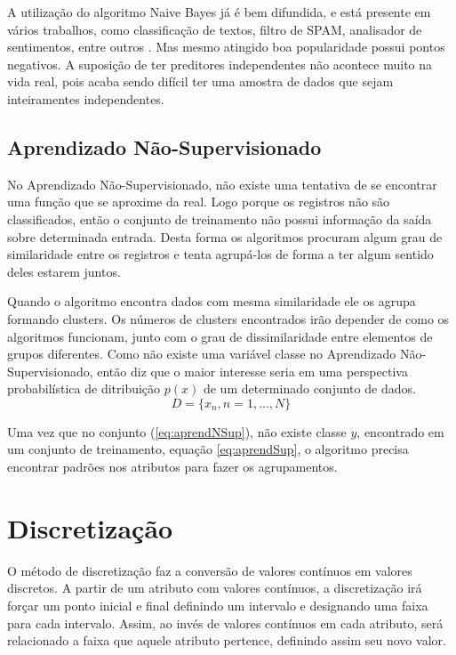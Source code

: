 A utilização do algoritmo Naive Bayes já é bem difundida, e está presente em vários trabalhos, como classificação de textos, filtro de SPAM, analisador de sentimentos, entre outros \cite{ Madureira2017, Lucca2013, Wu2008, Mccallum1997}. Mas mesmo atingido boa popularidade possui pontos negativos. A suposição de ter preditores independentes não acontece muito na vida real, pois acaba sendo difícil ter uma amostra de dados que sejam inteiramentes independentes. 


\subsection{Aprendizado Não-Supervisionado}\label{ssec:aprendNSup}

No Aprendizado Não-Supervisionado, não existe uma tentativa de se encontrar uma função que se aproxime da real. Logo porque os registros não são classificados, então o conjunto de treinamento não possui informação da saída sobre determinada entrada. Desta forma os algoritmos procuram algum grau de similaridade entre os registros e tenta agrupá-los de forma a ter algum sentido deles estarem juntos. 

Quando o algoritmo encontra dados com mesma similaridade ele os agrupa formando clusters. Os números de clusters encontrados irão depender de como os algoritmos funcionam, junto com o grau de dissimilaridade entre elementos de grupos diferentes. Como não existe uma variável classe no Aprendizado Não-Supervisionado, então \cite{Barber2011} diz que o maior interesse seria em uma perspectiva probabilística de ditribuição ${p(x)}$ de um determinado conjunto de dados.
\begin{equation}
 D = \{x_{n},n=1,...,N\}
 \label{eq:aprendNSup}
\end{equation}

Uma vez que no conjunto (\ref{eq:aprendNSup}), não existe classe ${y}$, encontrado em um conjunto de treinamento, equação \ref{eq:aprendSup}, o algoritmo precisa encontrar padrões nos atributos para fazer os agrupamentos.


\section{Discretização}\label{cap:refTeor:sec:discret}

O método de discretização faz a conversão de valores contínuos em valores discretos. A partir de um atributo com valores contínuos, a discretização irá forçar um ponto inicial e final definindo um intervalo e designando uma faixa para cada intervalo. Assim, ao invés de valores contínuos em cada atributo, será relacionado a faixa que aquele atributo pertence, definindo assim seu novo valor.

